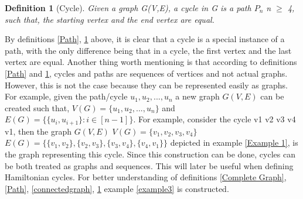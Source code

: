 \documentclass{article}
\newtheorem{definition}{Definition}[subsection]
\begin{document}
\begin{definition}[Cycle]
\label{cycle}
Given a graph G(V,E), a cycle in G is a path $P_n$ n $\geq$ 4, such that, the starting vertex and the end vertex are equal.  
\end{definition}
By definitions \ref{Path}, \ref{cycle} above, it is clear that a cycle is a special instance of a path, with the only difference being that in a cycle, the first vertex and the last vertex are equal. Another thing worth mentioning is that according to definitions \ref{Path} and \ref{cycle}, cycles and paths are sequences of vertices and not actual graphs. However, this is not the case because they can be represented easily as graphs. For example, given the path/cycle $\mathit{u_1, u_2, ...,u_n}$ a new graph $\mathit{G(V,E)}$ can be created such that, $\mathit{V(G)= \{ u_1, u_2, ..., u_n\}}$ and $\mathit{E(G) = \{ \{u_i, u_{i+1}\} : i \in [n-1]\}}$. For example, consider the cycle v1 v2 v3 v4 v1, then the graph $\mathit{G(V,E)}$ $\mathit{V(G)= \{ v_1, v_2, v_3, v_4\}}$ \\$\mathit{E(G) = \{ \{v_1, v_2\}, \{v_2, v_3\}, \{v_3, v_4\}, \{v_4, v_1\} \}}$ depicted in example \ref{Example 1}, is the graph representing this cycle. Since this construction can be done, cycles can be both treated as graphs and sequences. This will later be useful when defining Hamiltonian cycles. For better understanding of definitions \ref{Complete Graph}, \ref{Path}, \ref{connectedgraph}, \ref{cycle} example \ref{example3} is constructed.
\end{document}
